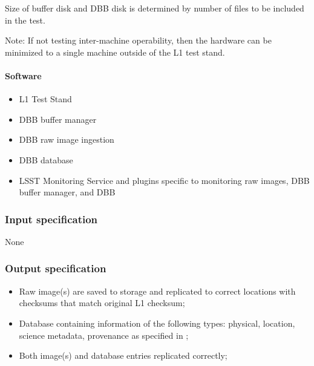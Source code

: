 \documentclass[DM,lsstdraft,STS,toc]{lsstdoc}
\begin{document}
Size of buffer disk and DBB disk is determined by number of files to be included in the test.


Note: If not testing inter-machine operability, then the hardware can be minimized
to a single machine outside of the L1 test stand.


\paragraph{Software}
\begin{itemize}
\item{L1 Test Stand}
\item{DBB buffer manager}
\item{DBB raw image ingestion}
\item{DBB database}
\item{LSST Monitoring Service and plugins specific to monitoring raw images, DBB buffer manager, and DBB}
\end{itemize}




\subsubsection{Input specification}
None


\subsubsection{Output specification}
\begin{itemize}
\item{Raw image(s) are saved to storage and replicated to correct locations with checksums that match
original L1 checksum;}
\item{Database containing information of the following types: physical, location, science metadata,
provenance as specified in ;}
\item{Both image(s) and database entries replicated correctly;}
\end{itemize}
\end{document}
